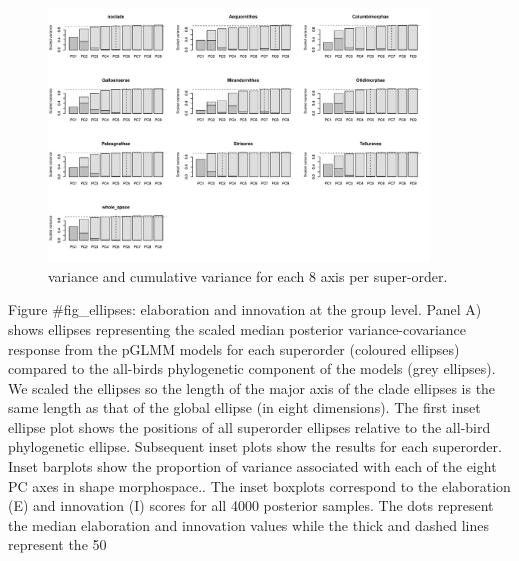 \documentclass[sn-mathphys]{sn-jnl}%
\theoremstyle{thmstyleone}%
\theoremstyle{thmstyletwo}%
\theoremstyle{thmstylethree}%
\begin{document}
\begin{figure}[!htbp]
\centering
   \includegraphics[width=0.9\textwidth]{Figures/Supplementary_figure_axis_selection.pdf}
\caption{variance and cumulative variance for each 8 axis per super-order.}
\label{fig_ellipses_passeriformes}
\end{figure}


Figure {#fig_ellipses}: elaboration and innovation at the group level. Panel A) shows  ellipses representing the scaled median posterior variance-covariance response from the pGLMM models for each superorder (coloured ellipses) compared to the all-birds phylogenetic component of the models (grey ellipses). We scaled the ellipses so the length of the major axis of the clade ellipses is the same length as that of the global ellipse (in eight dimensions). The first inset ellipse plot shows the positions of all superorder ellipses relative to the all-bird phylogenetic ellipse. Subsequent inset plots show the results for each superorder. Inset barplots show the proportion of variance associated with each of the eight PC axes in shape morphospace.. The inset boxplots correspond to the elaboration (E) and innovation (I) scores  for all 4000 posterior samples. The dots represent the median elaboration and innovation values while the thick and dashed lines represent the 50%
\end{document}
